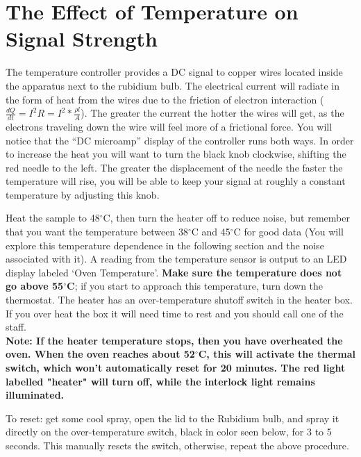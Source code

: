 \documentclass{../lab}
\begin{document}
\section{The Effect of Temperature on Signal Strength}

The temperature controller provides a DC signal to copper wires located inside the apparatus next to the rubidium bulb. The electrical current will radiate in the form of heat from the wires due to the friction of electron interaction ($\frac{dQ}{dt} = I^2 R = I^2 * \frac{\rho l}{A}$).  The greater the current the hotter the wires will get, as the electrons traveling down the wire will feel more of a frictional force. You will notice that the ``DC microamp'' display of the controller runs both ways. In order to increase the heat you will want to turn the black knob clockwise, shifting the red needle to the left. The greater the displacement of the needle the faster the temperature will rise, you will be able to keep your signal at roughly a constant temperature by adjusting this knob. \\

\newpage

Heat the sample to 48$^\circ$C, then turn the heater off to reduce noise, but remember that you want the temperature between 38$^\circ$C and 45$^\circ$C for good data (You will explore this temperature dependence in the following section and the noise associated with it). A reading from the temperature sensor is output to an LED display labeled `Oven Temperature'. \textbf{Make sure the temperature does not go above 55$^\circ$C}; if you start to approach this temperature, turn down the thermostat. The heater has an over-temperature shutoff switch in the heater box. If you over heat the box it will need time to rest and you should call one of the staff. \\

\textbf{Note: If the heater temperature stops, then you have overheated the oven.
When the oven reaches about 52$^\circ$C, this will activate the thermal switch, which won't automatically reset for 20 minutes. The red light labelled "heater" will turn off, while the interlock light remains illuminated.}

To reset: get some cool spray, open the lid to the Rubidium bulb, and spray it directly on the over-temperature switch, black in color seen below, for 3 to 5 seconds. This manually resets the switch, otherwise, repeat the above procedure.
\end{document}
